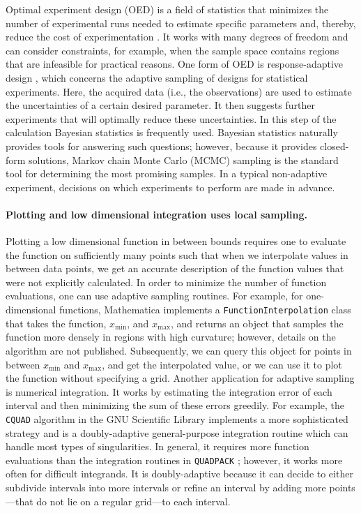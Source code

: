 \documentclass[english, twocolumn, 10pt, aps, superscriptaddress, floatfix, prb, citeautoscript]{revtex4-1}
\renewcommand{\citep}{\cite}
\newcommand{\passthrough}[1]{\lstset{mathescape=false}#1\lstset{mathescape=true}}
\begin{document}
Optimal experiment design (OED) is a field of statistics that minimizes the number of experimental runs needed to estimate specific parameters and, thereby, reduce the cost of experimentation \citep{Emery1998}.
It works with many degrees of freedom and can consider constraints, for example, when the sample space contains regions that are infeasible for practical reasons.
One form of OED is response-adaptive design \citep{Hu2006}, which concerns the adaptive sampling of designs for statistical experiments.
Here, the acquired data (i.e., the observations) are used to estimate the uncertainties of a certain desired parameter.
It then suggests further experiments that will optimally reduce these uncertainties.
In this step of the calculation Bayesian statistics is frequently used.
Bayesian statistics naturally provides tools for answering such questions; however, because it provides closed-form solutions, Markov chain Monte Carlo (MCMC) sampling is the standard tool for determining the most promising samples.
In a typical non-adaptive experiment, decisions on which experiments to perform are made in advance.

\paragraph{Plotting and low dimensional integration uses local sampling.}

Plotting a low dimensional function in between bounds requires one to evaluate the function on sufficiently many points such that when we interpolate values in between data points, we get an accurate description of the function values that were not explicitly calculated.
In order to minimize the number of function evaluations, one can use adaptive sampling routines.
For example, for one-dimensional functions, Mathematica \citep{WolframResearch} implements a \passthrough{\lstinline!FunctionInterpolation!} class that takes the function, \(x_\textrm{min}\), and \(x_\textrm{max}\), and returns an object that samples the function more densely in regions with high curvature; however, details on the algorithm are not published.
Subsequently, we can query this object for points in between \(x_\textrm{min}\) and \(x_\textrm{max}\), and get the interpolated value, or we can use it to plot the function without specifying a grid.
Another application for adaptive sampling is numerical integration.
It works by estimating the integration error of each interval and then minimizing the sum of these errors greedily.
For example, the \passthrough{\lstinline!CQUAD!} algorithm \citep{Gonnet2010} in the GNU Scientific Library \citep{Galassi1996} implements a more sophisticated strategy and is a doubly-adaptive general-purpose integration routine which can handle most types of singularities.
In general, it requires more function evaluations than the integration routines in \passthrough{\lstinline!QUADPACK!} \citep{Galassi1996}; however, it works more often for difficult integrands.
It is doubly-adaptive because it can decide to either subdivide intervals into more intervals or refine an interval by adding more points---that do not lie on a regular grid---to each interval.
\end{document}
